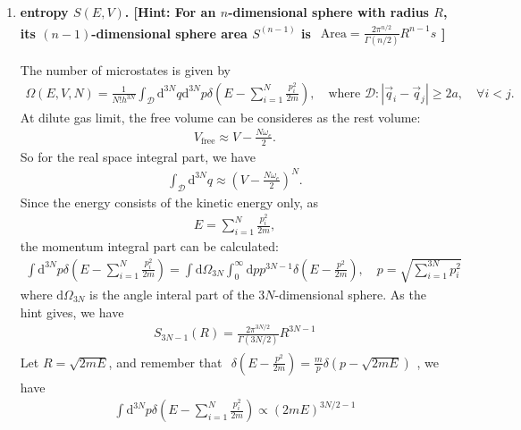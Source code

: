 \documentclass[../../main.tex]{subfiles}
\begin{document}
  \begin{enumerate}
    \item \textbf{entropy $S(E,V)$. [Hint: For an $n$-dimensional sphere with radius $R$, its $(n-1)$-dimensional sphere area $S^{(n-1)}$ is  $\begin{aligned}
      \text{Area} = \frac{2\pi^{n/2}}{\Gamma(n/2)}R^{n-1}s
    \end{aligned}$]}
    
    The number of microstates is given by
    \begin{align*}
      \Omega(E,V,N) = \frac{1}{N!h^{3N}}\int_{\mathcal{D}}\mathrm{d}^{3N}q\mathrm{d}^{3N}p\delta\left(E - \sum_{i=1}^{N}\frac{p_{i}^{2}}{2m}\right),\quad \text{where } \mathcal{D}: |\vec{q}_{i}-\vec{q}_{j}|\geq 2a, \quad \forall i<j.
    \end{align*}
    At dilute gas limit, the free volume can be consideres as the rest volume:
    \begin{align*}
      V_{\text{free}} \approx V - \frac{N\omega_{e}}{2}.
    \end{align*}
    So for the real space integral part, we have
    \begin{align*}
      \int_{\mathcal{D}}\mathrm{d}^{3N}q\approx \left(V - \frac{N\omega_{e}}{2}\right)^{N}.
    \end{align*}
    Since the energy consists of the kinetic energy only, as
    \begin{align*}
      E = \sum_{i=1}^{N}\frac{p_{i}^{2}}{2m},
    \end{align*}
    the momentum integral part can be calculated:
    \begin{align*}
      \int\mathrm{d}^{3N}p\delta\left(E - \sum_{i=1}^{N}\frac{p_{i}^{2}}{2m}\right) = \int\mathrm{d}\Omega_{3N}\int_{0}^{\infty}\mathrm{d}p p^{3N-1}\delta(E-\frac{p^{2}}{2m}),\quad p = \sqrt{\sum_{i=1}^{3N}p_{i}^{2}}
    \end{align*}
    where $\mathrm{d}\Omega_{3N}$ is the angle interal part of the $3N$-dimensional sphere. As the hint gives, we have
    \begin{align*}
      S_{3N-1}(R) = \frac{2\pi^{3N/2}}{\Gamma(3N/2)}R^{3N-1}
    \end{align*}
    Let $R = \sqrt{2mE}$, and remember that $\begin{aligned}
      \delta(E - \frac{p^{2}}{2m}) = \frac{m}{p}\delta(p-\sqrt{2mE})
    \end{aligned}$, we have
    \begin{align*}
      \int\mathrm{d}^{3N}p\delta\left(E - \sum_{i=1}^{N}\frac{p_{i}^{2}}{2m}\right) \propto (2mE)^{3N/2 - 1}

\end{align*}
\end{enumerate}
\end{document}
